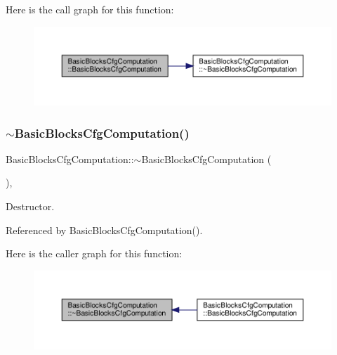 Here is the call graph for this function\+:
\nopagebreak
\begin{figure}[H]
\begin{center}
\leavevmode
\includegraphics[width=350pt]{d5/d4c/classBasicBlocksCfgComputation_abe3d2ac93963619745c87ca963de44bd_cgraph}
\end{center}
\end{figure}
\mbox{\label{classBasicBlocksCfgComputation_acbd868fde81d031693af6485abc83342}} 
\subsubsection{\texorpdfstring{$\sim$\+Basic\+Blocks\+Cfg\+Computation()}{~BasicBlocksCfgComputation()}}
{\footnotesize\ttfamily Basic\+Blocks\+Cfg\+Computation\+::$\sim$\+Basic\+Blocks\+Cfg\+Computation (\begin{DoxyParamCaption}{ }\end{DoxyParamCaption})\hspace{0.3cm}{\ttfamily [override]}, {\ttfamily [default]}}



Destructor. 



Referenced by Basic\+Blocks\+Cfg\+Computation().

Here is the caller graph for this function\+:
\nopagebreak
\begin{figure}[H]
\begin{center}
\leavevmode
\includegraphics[width=350pt]{d5/d4c/classBasicBlocksCfgComputation_acbd868fde81d031693af6485abc83342_icgraph}
\end{center}
\end{figure}


